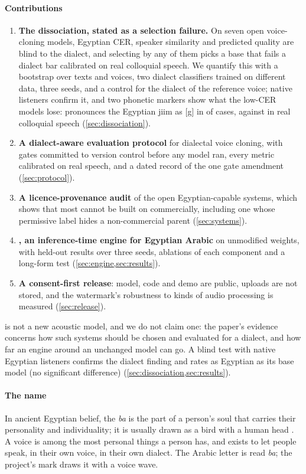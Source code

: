 \paragraph{Contributions}
\begin{enumerate}[leftmargin=*]
  \item \textbf{The dissociation, stated as a selection failure.} On seven open voice-cloning models, Egyptian CER,
  speaker similarity and predicted quality are blind to the dialect, and selecting by any of them picks a base that
  fails a dialect bar calibrated on real colloquial speech. We quantify this with a bootstrap over texts and voices,
  two dialect classifiers trained on different data, three seeds, and a control for the dialect of the reference
  voice; native listeners confirm it, and two phonetic markers show what the low-CER models lose: \cbthree pronounces
  the Egyptian jiim as [g] in  of cases, against  in real colloquial speech
  (\cref{sec:dissociation}).
  \item \textbf{A dialect-aware evaluation protocol} for dialectal voice cloning, with gates committed to version control
  before any model ran, every metric calibrated on real speech, and a dated record of the one gate
  amendment (\cref{sec:protocol}).
  \item \textbf{A licence-provenance audit} of the open Egyptian-capable systems, which shows that most cannot be
  built on commercially, including one whose permissive label hides a non-commercial parent (\cref{sec:systems}).
  \item \textbf{\BA, an inference-time engine for Egyptian Arabic} on unmodified \vox weights, with held-out
  results over three seeds, ablations of each component and a long-form test (\cref{sec:engine,sec:results}).
  \item \textbf{A consent-first release}: model, code and demo are public, uploads are not stored, and the
  watermark's robustness to  kinds of audio processing is measured (\cref{sec:release}).
\end{enumerate}
\BA is not a new acoustic model, and we do not claim one: the paper's evidence concerns how such systems should be
chosen and evaluated for a dialect, and how far an engine around an unchanged model can go. A blind test with
 native Egyptian listeners confirms the dialect finding and rates \BA as Egyptian as its base model (no significant difference)
(\cref{sec:dissociation,sec:results}).

\paragraph{The name}
In ancient Egyptian belief, the \emph{ba} is the part of a person's soul that carries their personality and
individuality; it is usually drawn as a bird with a human head \citep{taylor2001death}. A voice is among the most
personal things a person has, and \BA exists to let people speak, in their own voice, in their own dialect. The Arabic
letter  is read \emph{ba}; the project's mark draws it with a voice wave.

